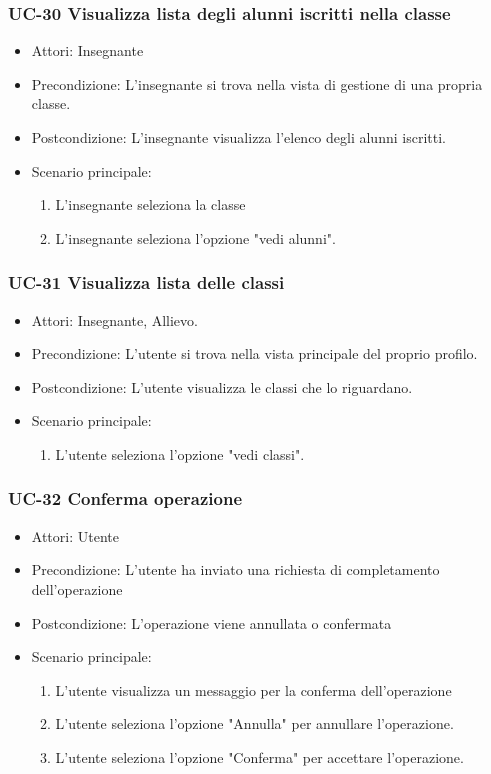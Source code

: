 \subsubsection{UC-30 Visualizza lista degli alunni iscritti nella classe}		
\begin{itemize}
	\item Attori: Insegnante
	\item Precondizione: L'insegnante si trova nella vista di gestione di una propria classe.
	\item Postcondizione: L'insegnante visualizza l'elenco degli alunni iscritti.
	\item Scenario principale:
	\begin{enumerate}
		\item L'insegnante seleziona la classe
		\item L'insegnante seleziona l'opzione "vedi alunni".
	\end{enumerate}		
\end{itemize}

\subsubsection{UC-31 Visualizza lista delle classi}		
\begin{itemize}
	\item Attori: Insegnante, Allievo.
	\item Precondizione: L'utente si trova nella vista principale del proprio profilo.
	\item Postcondizione: L'utente visualizza le classi che lo riguardano.
	\item Scenario principale:
	\begin{enumerate}
		\item L'utente seleziona l'opzione "vedi classi".
	\end{enumerate}		
\end{itemize}

\subsubsection{UC-32 Conferma operazione}		
\begin{itemize}
	\item Attori: Utente
	\item Precondizione: L'utente ha inviato una richiesta di completamento dell'operazione
	\item Postcondizione: L'operazione viene annullata o confermata
	\item Scenario principale:
	\begin{enumerate}
		\item L'utente visualizza un messaggio per la conferma dell'operazione
		\item L'utente seleziona l'opzione "Annulla" per annullare l'operazione.
		\item L'utente seleziona l'opzione "Conferma" per accettare l'operazione.
	\end{enumerate}		
\end{itemize}

